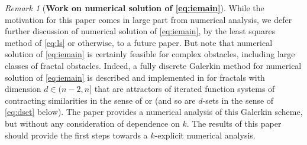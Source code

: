 \documentclass{birkjour}
\theoremstyle{definition}
\theoremstyle{remark}
\newtheorem{remark}[theorem]{Remark}
\numberwithin{equation}{section}
\providecommand{\blue}{\textcolor{blue}}
\begin{document}

\begin{remark}[\bf Work on numerical solution of \eqref{eq:iemain}] While the motivation for this paper comes in large part from  numerical analysis, we defer further discussion of numerical solution of \eqref{eq:iemain}, by the least squares method of \eqref{eq:ls} or otherwise, to a future paper. But note that numerical solution of  \eqref{eq:iemain} is certainly feasible for complex obstacles, including large classes of fractal obstacles. Indeed, a fully discrete Galerkin method for numerical solution of \eqref{eq:iemain} is described and implemented in \cite{caetano2025integral} for fractals with dimension $d\in (n-2,n]$ that are attractors of iterated function systems of contracting similarities in the sense of \cite[\S2(a)]{caetano2025integral} or \cite[\S9.2]{Falconer2014} (and so are $d$-sets in the sense of \eqref{eq:dset} below). The paper \cite{caetano2025integral} provides a numerical analysis of this Galerkin scheme, but without any consideration of dependence on $k$. The results of this paper should provide the first steps towards a $k$-explicit numerical analysis.
\end{remark}



\end{document}
